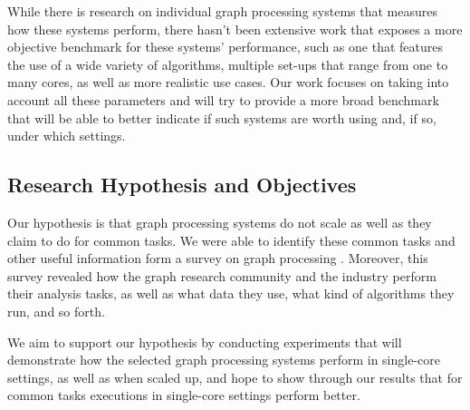 \documentclass[a4paper,11pt]{article}
\begin{document}
\par While there is research on individual graph processing systems that measures how these systems perform, there hasn't been extensive work that exposes a more objective benchmark for these systems' performance, such as one that features the use of a wide variety of algorithms, multiple set-ups that range from one to many cores, as well as more realistic use cases. Our work focuses on taking into account all these parameters and will try to provide a more broad benchmark that will be able to better indicate if such systems are worth using and, if so, under which settings.


\subsection{Research Hypothesis and Objectives} \label{hypothesis}

\par Our hypothesis is that graph processing systems do not scale as well as they claim to do for common tasks. We were able to identify these common tasks and other useful information form a survey on graph processing \cite{survey}. Moreover, this survey revealed how the graph research community and the industry perform their analysis tasks, as well as what data they use, what kind of algorithms they run, and so forth.

\par We aim to support our hypothesis by conducting experiments that will demonstrate how the selected graph processing systems perform in single-core settings, as well as when scaled up, and hope to show through our results that for common tasks executions in single-core settings perform better.

\end{document}
